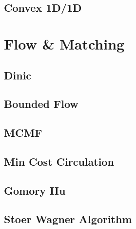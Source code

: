 \documentclass[a4paper,10pt,oneside]{article}
\begin{document}
\subsection{Convex 1D/1D}


%

\section{Flow \& Matching}

\subsection{Dinic}


\subsection{Bounded Flow}


\subsection{MCMF}


\subsection{Min Cost Circulation}


\subsection{Gomory Hu}


%

\subsection{Stoer Wagner Algorithm}

\end{document}
